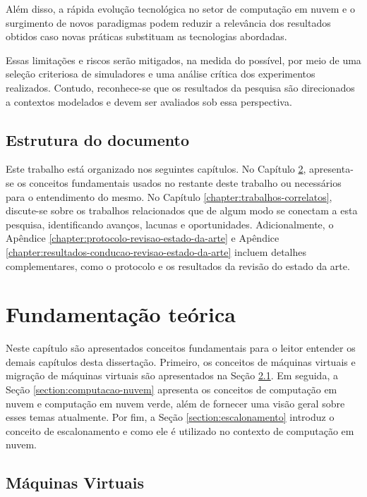 \documentclass[
	12pt,				%
	oneside,			%
	a4paper,			%
	english,			%
	brazil				%
	]{abntex2ppgsi}
\begin{document}
Além disso, a rápida evolução tecnológica no setor de computação em nuvem e o surgimento de novos paradigmas podem reduzir a relevância dos resultados obtidos caso novas práticas substituam as tecnologias abordadas.

Essas limitações e riscos serão mitigados, na medida do possível, por meio de uma seleção criteriosa de simuladores e uma análise crítica dos experimentos realizados. Contudo, reconhece-se que os resultados da pesquisa são direcionados a contextos modelados e devem ser avaliados sob essa perspectiva.


\section{Estrutura do documento}
Este trabalho está organizado nos seguintes capítulos. No Capítulo \ref{chapter:fundamentacao-teorica}, apresenta-se os conceitos fundamentais usados no restante deste trabalho ou necessários para o entendimento do mesmo. No Capítulo \ref{chapter:trabalhos-correlatos}, discute-se sobre os trabalhos relacionados que de algum modo se conectam a esta pesquisa, identificando avanços, lacunas e oportunidades. Adicionalmente, o Apêndice \ref{chapter:protocolo-revisao-estado-da-arte} e Apêndice \ref{chapter:resultados-conducao-revisao-estado-da-arte} incluem detalhes complementares, como o protocolo e os resultados da revisão do estado da arte.

\chapter{Fundamentação teórica}\label{chapter:fundamentacao-teorica}

Neste capítulo são apresentados conceitos fundamentais para o leitor entender os demais capítulos desta dissertação. Primeiro, os conceitos de máquinas virtuais e migração de máquinas virtuais são apresentados na Seção \ref{section:maquinas-virtuais}. Em seguida, a Seção \ref{section:computacao-nuvem} apresenta os conceitos de computação em nuvem e computação em nuvem verde, além de fornecer uma visão geral sobre esses temas atualmente. Por fim, a Seção \ref{section:escalonamento} introduz o conceito de escalonamento e como ele é utilizado no contexto de computação em nuvem.

\section{Máquinas Virtuais}\label{section:maquinas-virtuais}
\end{document}
